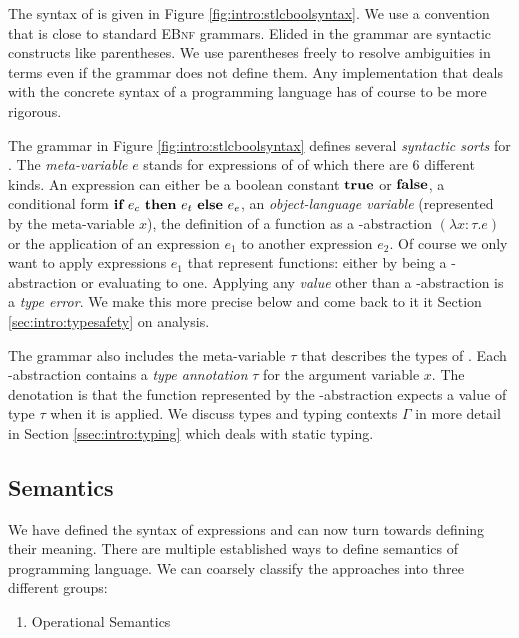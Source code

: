 {The syntax of \stlcbool is given in Figure \ref{fig:intro:stlcboolsyntax}. We
use a convention that is close to standard \textsc{EBnf} grammars. Elided in the
grammar are syntactic constructs like parentheses. We use parentheses freely to
resolve ambiguities in terms even if the grammar does not define them. Any
implementation that deals with the concrete syntax of a programming language has
of course to be more rigorous.

The grammar in Figure \ref{fig:intro:stlcboolsyntax} defines several
\emph{syntactic sorts} for \stlcbool. The \emph{meta-variable} $e$ stands for
expressions of \stlcbool of which there are 6 different kinds. An expression can
either be a boolean constant $\textbf{true}$ or $\textbf{false}$, a conditional form
$\textbf{if}~{e_c}~\textbf{then}~{e_t}~\textbf{else}~{e_e}$, an \emph{object-language variable} (represented by the
meta-variable $x$), the definition of a function as a \textlambda-abstraction
$(\lambda x:\tau.e)$ or the application of an expression $e_1$ to another
expression $e_2$. Of course we only want to apply expressions $e_1$ that
represent functions: either by being a \textlambda-abstraction or evaluating to
one. Applying any \emph{value} other than a \textlambda-abstraction is a
\emph{type error}. We make this more precise below and come back to it it
Section \ref{sec:intro:typesafety} on analysis.

The grammar also includes the meta-variable $\tau$ that describes the types of
\stlcbool. Each \textlambda-abstraction contains a \emph{type annotation} $\tau$
for the argument variable $x$. The denotation is that the function represented
by the \textlambda-abstraction expects a value of type $\tau$ when it is
applied. We discuss types and typing contexts $\Gamma$ in more detail in Section
\ref{ssec:intro:typing} which deals with static typing.


\subsection{Semantics}\label{ssec:intro:semantics}

We have defined the syntax of \stlcbool expressions and can now turn towards
defining their meaning. There are multiple established ways to define semantics
of programming language. We can coarsely classify the approaches into three
different groups:

\begin{enumerate}
\item Operational Semantics


\end{enumerate}}
